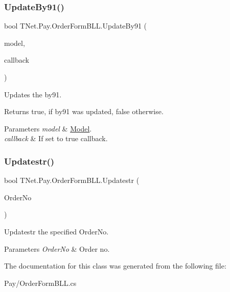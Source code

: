 \subsubsection{\texorpdfstring{Update\+By91()}{UpdateBy91()}}
{\footnotesize\ttfamily bool T\+Net.\+Pay.\+Order\+Form\+B\+L\+L.\+Update\+By91 (\begin{DoxyParamCaption}\item[{\mbox{\hyperlink{class_t_net_1_1_pay_1_1_order_info}{Order\+Info}}}]{model,  }\item[{bool}]{callback }\end{DoxyParamCaption})}



Updates the by91. 

\begin{DoxyReturn}{Returns}
{\ttfamily true}, if by91 was updated, {\ttfamily false} otherwise.
\end{DoxyReturn}

\begin{DoxyParams}{Parameters}
{\em model} & \mbox{\hyperlink{namespace_t_net_1_1_model}{Model}}.\\
\hline
{\em callback} & If set to {\ttfamily true} callback.\\
\hline
\end{DoxyParams}
\mbox{\label{class_t_net_1_1_pay_1_1_order_form_b_l_l_ac48da1e64f8bd3f2555e086ffaf89f72}} 
\subsubsection{\texorpdfstring{Updatestr()}{Updatestr()}}
{\footnotesize\ttfamily bool T\+Net.\+Pay.\+Order\+Form\+B\+L\+L.\+Updatestr (\begin{DoxyParamCaption}\item[{string}]{Order\+No }\end{DoxyParamCaption})}



Updatestr the specified Order\+No. 


\begin{DoxyParams}{Parameters}
{\em Order\+No} & Order no.\\
\hline
\end{DoxyParams}


The documentation for this class was generated from the following file\+:\begin{DoxyCompactItemize}
\item 
Pay/Order\+Form\+B\+L\+L.\+cs\end{DoxyCompactItemize}
